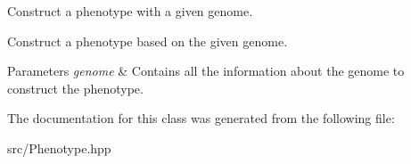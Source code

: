 Construct a phenotype with a given genome. 

Construct a phenotype based on the given genome. 
\begin{DoxyParams}{Parameters}
{\em genome} & Contains all the information about the genome to construct the phenotype. \\
\hline
\end{DoxyParams}


The documentation for this class was generated from the following file\+:\begin{DoxyCompactItemize}
\item 
src/Phenotype.\+hpp\end{DoxyCompactItemize}
